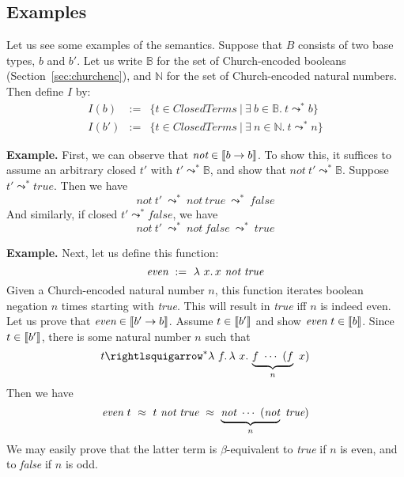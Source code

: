 \subsection{Examples}

Let us see some examples of the semantics.  Suppose that $B$ consists of two base types, $b$ and $b'$.  
Let us write $\mathbb{B}$ for the set of
Church-encoded booleans (Section~\ref{sec:churchenc}), and $\mathbb{N}$ for the set of
Church-encoded natural numbers.  Then define $I$ by:
\[
\begin{array}{lll}
  I(b) & := & \{ t\in\textit{ClosedTerms}\ |\ \exists\ b\in\mathbb{B}.\ t \leadsto^* b\} \\
  I(b') & := & \{ t\in\textit{ClosedTerms}\ |\ \exists\ n\in\mathbb{N}.\ t \leadsto^* n\} 
\end{array}
\]
\noindent

\textbf{Example.} First, we can observe that $\textit{not}\in\llbracket b\to b \rrbracket$.  To show this, it suffices to
  assume an arbitrary closed $t'$ with $t'\leadsto^*\mathbb{B}$, and show
  that $\textit{not}\ t'\leadsto^*\mathbb{B}$. Suppose $t'\leadsto^*\textit{true}$.
  Then we have
  \[
  \textit{not}\ t' \ \leadsto^*\  \textit{not}\ \textit{true}\ \leadsto^*\ \textit{false}
  \]
  \noindent And similarly, if closed $t'\leadsto^*\textit{false}$, we have
  \[
  \textit{not}\ t' \ \leadsto^*\  \textit{not}\ \textit{false}\ \leadsto^*\ \textit{true}
  \]

\textbf{Example.} Next, let us define this function:
  \[
  \textit{even}\ :=\ \lam{x}{x\ \textit{not}\ \textit{true}}
  \]
  \noindent Given a Church-encoded natural number $n$, this function iterates boolean negation
  $n$ times starting with \textit{true}.  This will result in \textit{true} iff $n$ is indeed even.
  Let us prove that $\textit{even} \in \llbracket b' \to b \rrbracket$.  Assume $t\in\llbracket b' \rrbracket$ and show $\textit{even}\ t \in \llbracket b \rrbracket$.
  Since $t\in\llbracket b' \rrbracket$, there is some natural number $n$ such that
  \[
  t \betaa^* \lam{f}{\lam{x}{\underbrace{f\ \cdots\ (f}_n\ x)}}
  \]
  \noindent Then we have
  \[
  \textit{even}\ t\ \betaeq\ t\ \textit{not}\ \textit{true}\ \betaeq\ \underbrace{\textit{not}\ \cdots\ (\textit{not}}_n\ \textit{true})
  \]
  \noindent We may easily prove that the latter term is $\beta$-equivalent to \textit{true} if $n$ is even, and to \textit{false} if $n$ is odd.



